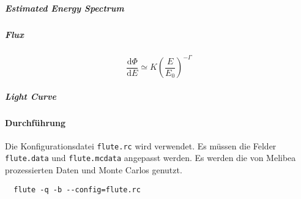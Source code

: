 \subparagraph{Estimated Energy Spectrum}
\subparagraph{Flux}

\begin{equation}
\frac{\text{d} \Phi}{\text{d}E} \simeq K {\left( \frac{E}{E_0} \right)}^{- \Gamma}
\end{equation}

\subparagraph{Light Curve}

\paragraph{Durchführung}%

Die Konfigurationsdatei \texttt{flute.rc} wird verwendet.
Es müssen die Felder \texttt{flute.data} und \texttt{flute.mcdata} angepasst werden.
Es werden die von Melibea prozessierten Daten und Monte Carlos genutzt.


\begin{lstlisting}
  flute -q -b --config=flute.rc
\end{lstlisting}
